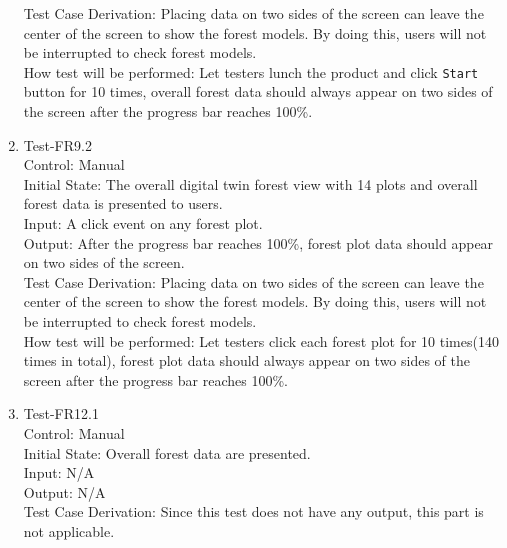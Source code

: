 \documentclass[12pt, titlepage]{article}
\begin{document}
\begin{enumerate}
Test Case Derivation: Placing data on two sides of the screen can leave the center
of the screen to show the forest models. By doing this, users will not be interrupted 
to check forest models. \\
					
How test will be performed: Let testers lunch the product and click \verb|Start| button
for 10 times, overall forest data should always appear on two sides of the screen 
after the progress bar reaches 100\%.

\item{Test-FR9.2\\}
Control: Manual\\ 

Initial State: The overall digital twin forest view with 14 plots 
and overall forest data is presented to users.\\

Input: A click event on any forest plot.\\

Output: After the progress bar reaches 100\%, forest plot data should appear on two
sides of the  screen. \\

Test Case Derivation: Placing data on two sides of the screen can leave the center
of the screen to show the forest models. By doing this, users will not be interrupted 
to check forest models. \\
					
How test will be performed: Let testers click each forest plot 
for 10 times(140 times in total), forest plot data should always appear on two sides of
 the screen after the progress bar reaches 100\%.

\item{Test-FR12.1\\}
Control: Manual\\ 

Initial State: Overall forest data are presented.\\

Input: N/A\\

Output: N/A\\

Test Case Derivation: Since this test does not have any output, this part is
not applicable.\\
					

\end{enumerate}
\end{document}
